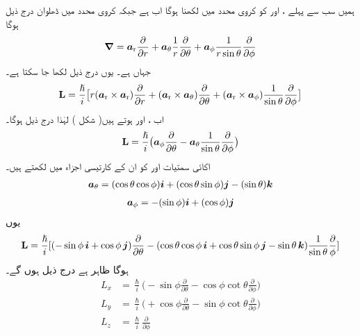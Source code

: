 ہمیں سب سے پہلے ،  اور  کو کروی محدد میں لکھنا ہوگا اب  ہے جبکہ کروی محدد میں ڈھلوان درج ذیل ہوگا 
\begin{align}
{\ensuremath{{\boldsymbol{\nabla}}}} = {\boldsymbol{a}}_{\textup{r}} \frac{\partial}{\partial r} + {\boldsymbol{a}}_{\theta} \frac{1}{r} \frac{\partial}{\partial \theta} + {\boldsymbol{a}}_{\phi} \frac{1}{r \sin {\theta}} \frac{\partial}{\partial \phi}
\end{align}
جہاں  ہے۔ یوں درج ذیل لکھا جا سکتا ہے۔
\begin{align*}
\operatorname{\mathbf{L}} = \frac{\hslash}{i} \big [ r ({\boldsymbol{a}}_{\textup{r}} \times {\boldsymbol{a}}_{\textup{r}}) \frac{\partial}{\partial r} + ({\boldsymbol{a}}_{\textup{r}} \times {\boldsymbol{a}}_{\theta}) \frac{\partial}{\partial \theta} + ({\boldsymbol{a}}_{\textup{r}} \times {\boldsymbol{a}}_{\phi}) \frac{1}{\sin \theta} \frac{\partial}{\partial \phi} \big ]
\end{align*}
اب ،  اور  ہوتے
 ہیں( شکل ) لہٰذا درج ذیل ہوگا۔ 
\begin{align}
\operatorname{\mathbf{L}} = \frac{\hslash}{i} \big ( {\boldsymbol{a}}_{\phi} \frac{\partial}{\partial \theta} - {\boldsymbol{a}}_{\theta} \frac{1}{\sin \theta} \frac{\partial}{\partial \phi} \big )
\end{align}
اکائی سمتیات  اور  کو ان کے کارتیسی اجزاء میں لکھتے ہیں۔ 
\begin{align}
{\boldsymbol{a}}_{\theta} = (\cos \theta \cos \phi) {\boldsymbol{i}} + (\cos \theta \sin \phi) {\boldsymbol{j}} - (\sin \theta) {\boldsymbol{k}}
\end{align}
\begin{align}
{\boldsymbol{a}}_{\phi} = - (\sin \phi) {\boldsymbol{i}} + (\cos \phi) {\boldsymbol{j}}
\end{align}
یوں 
\begin{align*}
\operatorname{\mathbf{L}} = \frac{\hslash}{i} [(- \sin \phi \,{\boldsymbol{i}} + \cos \phi\, {\boldsymbol{j}}) \frac{\partial}{\partial \theta} - (\cos \theta \cos \phi \,{\boldsymbol{i}} + \cos \theta \sin \phi \,{\boldsymbol{j}} - \sin \theta \,{\boldsymbol{k}}) \frac{1}{\sin \theta} \frac{\partial}{\phi}]
\end{align*}
ہوگا ظاہر ہے درج ذیل ہوں گے۔
\begin{align}
L_x &= \frac{\hslash}{i} \big ( - \sin \phi \frac{\partial}{\partial \theta} - \cos \phi \cot \theta \frac{\partial}{\partial \phi} \big )\\
L_y &= \frac{\hslash}{i} \big ( + \cos \phi \frac{\partial}{\partial \theta} - \sin \phi \cot \theta \frac{\partial}{\partial \phi} \big )\\
L_z &= \frac{\hslash}{i} \frac{\partial}{\partial \phi}\label{مساوات_تین_ابعادی_زیڈ_عامل}
\end{align} 

